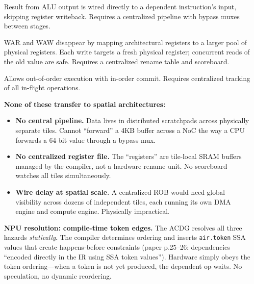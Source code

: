 \documentclass[11pt,a4paper]{article}
\begin{document}
\begin{description}[leftmargin=2em]
  \item[Data forwarding / bypassing:] Result from ALU output is wired directly to
    a dependent instruction's input, skipping register writeback. Requires a
    centralized pipeline with bypass muxes between stages.
  \item[Tomasulo / register renaming:] WAR and WAW disappear by mapping
    architectural registers to a larger pool of physical registers. Each write
    targets a fresh physical register; concurrent reads of the old value are safe.
    Requires a centralized rename table and scoreboard.
  \item[Reorder buffer (ROB):] Allows out-of-order execution with in-order
    commit. Requires centralized tracking of all in-flight operations.
\end{description}

\textbf{None of these transfer to spatial architectures:}
\begin{itemize}[leftmargin=2em]
  \item \textbf{No central pipeline.} Data lives in distributed scratchpads across
    physically separate tiles. Cannot ``forward'' a 4KB buffer across a NoC the
    way a CPU forwards a 64-bit value through a bypass mux.
  \item \textbf{No centralized register file.} The ``registers'' are tile-local
    SRAM buffers managed by the compiler, not a hardware rename unit. No
    scoreboard watches all tiles simultaneously.
  \item \textbf{Wire delay at spatial scale.} A centralized ROB would need global
    visibility across dozens of independent tiles, each running its own DMA engine
    and compute engine. Physically impractical.
\end{itemize}

\textbf{NPU resolution: compile-time token edges.} The ACDG resolves all three
hazards \emph{statically}. The compiler determines ordering and inserts
\texttt{air.token} SSA values that create happens-before constraints (paper p.25--26:
dependencies ``encoded directly in the IR using SSA token values''). Hardware simply
obeys the token ordering---when a token is not yet produced, the dependent op waits.
No speculation, no dynamic reordering.
\end{document}
